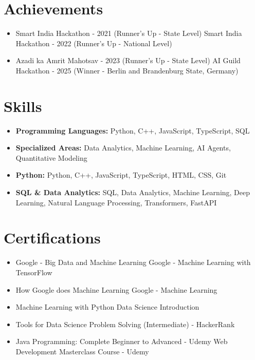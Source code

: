 \documentclass[a4paper,10pt]{article}
\begin{document}
\section*{Achievements}
\begin{itemize}
\item Smart India Hackathon - 2021 (Runner's Up - State Level) \hfill Smart India Hackathon - 2022 (Runner's Up - National Level)
\item Azadi ka Amrit Mahotsav - 2023 (Runner's Up - State Level) \hfill AI Guild Hackathon - 2025 (Winner - Berlin and Brandenburg State, Germany)
\end{itemize}

\section*{Skills}
\begin{itemize}
  \item \textbf{Programming Languages:} Python, C++, JavaScript, TypeScript, SQL
  \item \textbf{Specialized Areas:} Data Analytics, Machine Learning, AI Agents, Quantitative Modeling
  \item \textbf{Python:} Python, C++, JavaScript, TypeScript, HTML, CSS, Git
  \item \textbf{SQL \& Data Analytics:} SQL, Data Analytics, Machine Learning, Deep Learning, Natural Language Processing, Transformers, FastAPI
\end{itemize}

\section*{Certifications}
\begin{itemize}
\item Google - Big Data and Machine Learning \hfill Google - Machine Learning with TensorFlow
\item How Google does Machine Learning \hfill Google - Machine Learning
\item Machine Learning with Python \hfill Data Science Introduction
\item Tools for Data Science \hfill Problem Solving (Intermediate) - HackerRank
\item Java Programming: Complete Beginner to Advanced - Udemy \hfill Web Development Masterclass Course - Udemy
\end{itemize}
\end{document}
